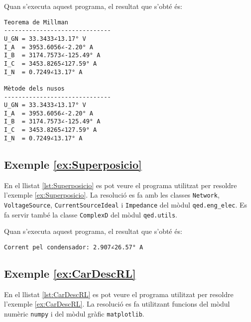 Quan s'executa aquest programa, el resultat que s'obté és:
\lstset{
	language=,
	numbers=none,
	frame=none
}
\begin{lstlisting}
Teorema de Millman
------------------------------
U_GN = 33.3433∠13.17° V
I_A  = 3953.6056∠-2.20° A
I_B  = 3174.7573∠-125.49° A
I_C  = 3453.8265∠127.59° A
I_N  = 0.7249∠13.17° A

Mètode dels nusos
------------------------------
U_GN = 33.3433∠13.17° V
I_A  = 3953.6056∠-2.20° A
I_B  = 3174.7573∠-125.49° A
I_C  = 3453.8265∠127.59° A
I_N  = 0.7249∠13.17° A
\end{lstlisting} 


\hypertarget{exemple:Superposicio}{\subsection{Exemple \ref*{ex:Superposicio} \Superposicio}}

En el llistat \vref{lst:Superposicio} es pot veure el programa utilitzat per resoldre l'exemple \vref{ex:Superposicio}. La resolució es fa amb les classes \texttt{Network}, \texttt{VoltageSource}, \texttt{CurrentSourceIdeal} i \texttt{Impedance} del mòdul \texttt{qed.eng\_elec}. Es fa servir també la classe \texttt{ComplexD} del mòdul \texttt{qed.utils}.


Quan s'executa aquest programa, el resultat que s'obté és:
\lstset{
	language=,
	numbers=none,
	frame=none
}
\begin{lstlisting}
Corrent pel condensador: 2.907∠26.57° A
\end{lstlisting} 


\hypertarget{exemple:CarDescRL}{\subsection{Exemple \ref*{ex:CarDescRL} \CarDescRL}}

En el llistat \vref{lst:CarDescRL} es pot veure el programa utilitzat per resoldre l'exemple \vref{ex:CarDescRL}. La resolució es fa utilitzant funcions del mòdul numèric \texttt{numpy} i del mòdul gràfic  \texttt{matplotlib}.


